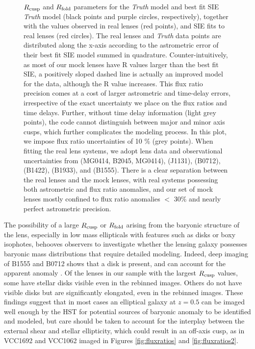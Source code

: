 \begin{itemize}
\begin{figure}
		\caption{\label{fig:poserr_vs_Rcuspfold} $R_{\rm{cusp}}$ and $R_{\rm{fold}}$ parameters for the \textit{Truth} model and best fit SIE \textit{Truth} model (black points and purple circles, respectively), together with the values observed in real lenses (red points), and SIE fits to real lenses (red circles). The real lenses and \textit{Truth} data points are distributed along the x-axis according to the astrometric error of their best fit SIE model summed in quadrature. Counter-intuitively, as most of our mock lenses have R values larger than the best fit SIE, a positively sloped dashed line is actually an improved model for the data, although the R value increases. This flux ratio precision comes at a cost of larger astrometric and time-delay errors, irrespective of the exact uncertainty we place on the flux ratios and time delays. Further, without time delay information (light grey points), the code cannot distinguish between major and minor axis cusps, which further complicates the modeling process. In this plot, we impose flux ratio uncertainties of 10 \% (grey points). When fitting the real lens systems, we adopt lens data and observational uncertainties from \cite{COSMOX} (MG0414, B2045, MG0414), \cite{Sluse++06} (J1131), \cite{Jackson98} (B0712), \cite{Nie++14} (B1422), \cite{Coh++01} (B1933), and \cite{HsuehEtal16} (B1555). There is a clear separation between the real lenses and the
			mock lenses, with real systems possessing both astrometric
			and  flux ratio anomalies, and our set of mock lenses mostly
			confined to  flux ratio anomalies $<$ 30\% and nearly perfect
			astrometric precision.}
	\end{figure}
\end{itemize}
The possibility of a large $R_{\rm{cusp}}$ or $R_{\rm{fold}}$ arising from the baryonic structure of the lens, especially in low mass ellipticals with features such as disks or boxy isophotes, behooves observers to investigate whether the lensing galaxy possesses baryonic mass distributions that require detailed modeling. Indeed, deep imaging of B1555 and B0712 shows that a disk is present, and can account for the apparent anomaly \cite{HsuehEtal16}. Of the lenses in our sample with the largest $R_{\rm{cusp}}$ values, some have stellar disks visible even in the rebinned images. Others do not have visible disks but are significantly elongated, even in the rebinned images. These findings suggest that in most cases an elliptical galaxy at $z=0.5$ can be imaged well enough by the HST for potential sources of baryonic anomaly to be identified and modeled, but care should be taken to account for the interplay between the external shear and stellar ellipticity, which could result in an off-axis cusp, as in VCC1692 and VCC1062 imaged in Figures \ref{fig:fluxratios} and \ref{fig:fluxratios2}.

